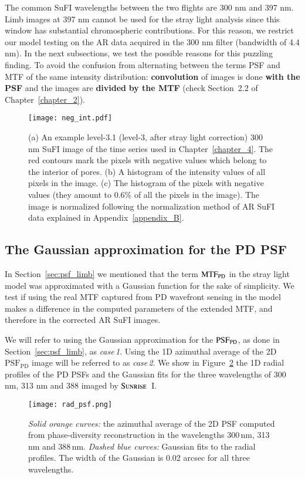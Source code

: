 \documentclass[goettingen, gauss, print]{thesis}
\begin{document}
The common SuFI wavelengths between the two flights are 300 nm and 397 nm. Limb images at 397 nm cannot be used for the stray light analysis since this window has substantial chromospheric contributions. For this reason, we restrict our model testing on the AR data acquired in the 300 nm filter (bandwidth of 4.4 nm). In the next subsections, we test the possible reasons for this puzzling finding. To avoid the confusion from alternating between the terms PSF and MTF of the same intensity distribution: \textbf{convolution} of images is done \textbf{with the PSF} and the images are \textbf{divided} \textbf{by the MTF} (check Section~2.2 of Chapter~\ref{chapter_2}).

\begin{figure}
\centering
\texttt{[image: neg\_int.pdf]}
\caption{(a) An example level-3.1 (level-3, after stray light correction) 300 nm SuFI image of the time series used in Chapter~\ref{chapter_4}. The red contours mark the pixels with negative values which belong to the interior of pores. (b) A histogram of the intensity values of all pixels in the image. (c) The histogram of the pixels with negative values (they amount to 0.6\% of all the pixels in the image). The image is normalized following the normalization method of AR SuFI data explained in Appendix~\ref{appendix_B}.}
\label{neg_int}

\end{figure}


\subsection{The Gaussian approximation for the PD PSF}
In Section~\ref{sec:psf_limb} we mentioned that the term $\mathrm{MTF}_{\mathrm{PD}}$ in the stray light model was approximated with a Gaussian function for the sake of simplicity. We test if using the real MTF captured from PD wavefront sensing in the model makes a difference in the computed parameters of the extended MTF, and therefore in the corrected AR SuFI images.

We will refer to using the Gaussian approximation for the $\mathrm{PSF}_{\mathrm{PD}}$, as done in Section~\ref{sec:psf_limb}, as \textit{case\,1}. Using the 1D azimuthal average of the 2D $\mathrm{PSF}_{\mathrm{PD}}$ image will be referred to as \textit{case\,2}. We show in Figure~\ref{rad_psf} the 1D radial profiles of the PD PSFs and the Gaussian fits for the three wavelengths of 300 nm, 313 nm and 388 imaged by $\textsc{Sunrise}$~I. 

\begin{figure}[h!]
\centering
\texttt{[image: rad\_psf.png]}
\caption{\textit{Solid orange curves:} the azimuthal average of the 2D PSF computed from phase-diversity reconstruction in the wavelengths 300\,nm, 313\,nm and 388\,nm. \textit{Dashed blue curves:} Gaussian fits to the radial profiles. The width of the Gaussian is 0.02 arcsec for all three wavelengths. }
\label{rad_psf}
\end{figure}
\end{document}
